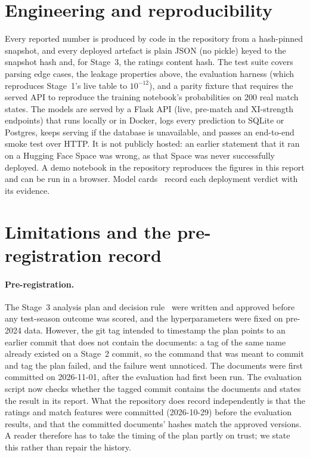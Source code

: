 \documentclass[11pt]{article}
\begin{document}
\section{Engineering and reproducibility}\label{sec:eng}

Every reported number is produced by code in the repository from a hash-pinned snapshot, and every
deployed artefact is plain JSON (no pickle) keyed to the snapshot hash and, for Stage~3, the ratings content
hash. The test suite covers parsing edge cases, the leakage properties above, the evaluation harness
(which reproduces Stage~1's live table to $10^{-12}$), and a parity fixture that requires the served API to
reproduce the training notebook's probabilities on 200 real match states. The models are served by a Flask API
(live, pre-match and XI-strength endpoints) that runs locally or in Docker, logs every prediction to SQLite or
Postgres, keeps serving if the database is unavailable, and passes an end-to-end smoke test over HTTP. It is not
publicly hosted: an earlier statement that it ran on a Hugging Face Space was wrong, as that Space was never
successfully deployed. A demo notebook in the repository reproduces the figures in this report and can be run
in a browser. Model cards~\citep{mitchell2019} record each deployment verdict with its evidence.

\section{Limitations and the pre-registration record}\label{sec:limits}

\paragraph{Pre-registration.} The Stage~3 analysis plan and decision rule~\citep{nosek2018} were written and
approved before any test-season outcome was scored, and the hyperparameters were fixed on pre-2024 data.
However, the git tag intended to timestamp the plan points to an earlier commit that does not contain the
documents: a tag of the same name already existed on a Stage~2 commit, so the command that was meant to
commit and tag the plan failed, and the failure went unnoticed. The documents were first committed on
2026-11-01, after the evaluation had first been run. The evaluation script now checks whether the tagged
commit contains the documents and states the result in its report. What the repository does record independently is that the ratings and match features
were committed (2026-10-29) before the evaluation results, and that the committed documents' hashes match
the approved versions. A reader therefore has to take the timing of the plan partly on trust; we state this
rather than repair the history.
\end{document}
